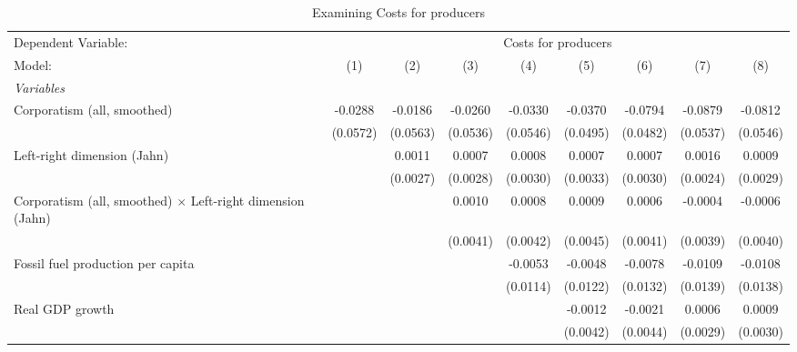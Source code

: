 
\begin{table}[htbp]
   \caption{Examining Costs for producers}
   \centering
   \begin{tabular}{lcccccccc}
      \tabularnewline \midrule \midrule
      Dependent Variable: & \multicolumn{8}{c}{Costs for producers}\\
      Model:                                                            & (1)      & (2)      & (3)      & (4)      & (5)      & (6)      & (7)      & (8)\\  
      \midrule
      \emph{Variables}\\
      Corporatism (all, smoothed)                                       & -0.0288  & -0.0186  & -0.0260  & -0.0330  & -0.0370  & -0.0794  & -0.0879  & -0.0812\\   
                                                                        & (0.0572) & (0.0563) & (0.0536) & (0.0546) & (0.0495) & (0.0482) & (0.0537) & (0.0546)\\   
      Left-right dimension (Jahn)                                       &          & 0.0011   & 0.0007   & 0.0008   & 0.0007   & 0.0007   & 0.0016   & 0.0009\\   
                                                                        &          & (0.0027) & (0.0028) & (0.0030) & (0.0033) & (0.0030) & (0.0024) & (0.0029)\\   
      Corporatism (all, smoothed) $\times$ Left-right dimension (Jahn)  &          &          & 0.0010   & 0.0008   & 0.0009   & 0.0006   & -0.0004  & -0.0006\\   
                                                                        &          &          & (0.0041) & (0.0042) & (0.0045) & (0.0041) & (0.0039) & (0.0040)\\   
      Fossil fuel production per capita                                 &          &          &          & -0.0053  & -0.0048  & -0.0078  & -0.0109  & -0.0108\\   
                                                                        &          &          &          & (0.0114) & (0.0122) & (0.0132) & (0.0139) & (0.0138)\\   
      Real GDP growth                                                   &          &          &          &          & -0.0012  & -0.0021  & 0.0006   & 0.0009\\   
                                                                        &          &          &          &          & (0.0042) & (0.0044) & (0.0029) & (0.0030)\\   

\end{tabular}
\end{table}
